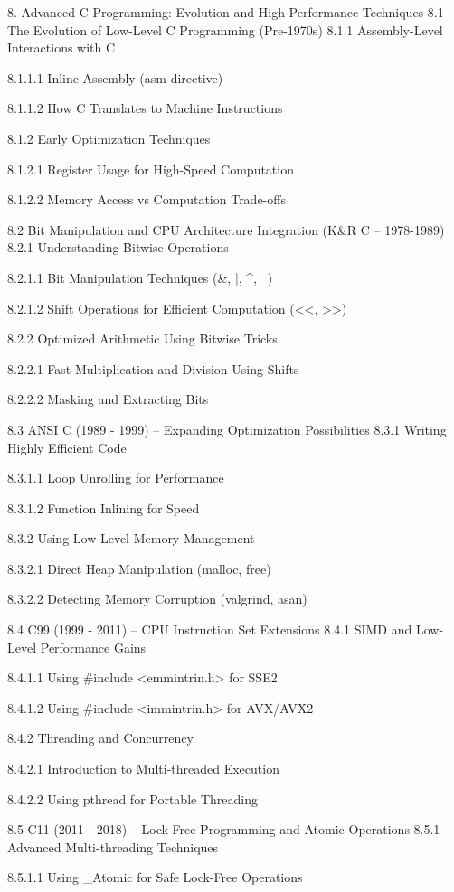 8. Advanced C Programming: Evolution and High-Performance Techniques
8.1 The Evolution of Low-Level C Programming (Pre-1970s)
8.1.1 Assembly-Level Interactions with C

8.1.1.1 Inline Assembly (asm directive)

8.1.1.2 How C Translates to Machine Instructions

8.1.2 Early Optimization Techniques

8.1.2.1 Register Usage for High-Speed Computation

8.1.2.2 Memory Access vs Computation Trade-offs

8.2 Bit Manipulation and CPU Architecture Integration (K&R C – 1978-1989)
8.2.1 Understanding Bitwise Operations

8.2.1.1 Bit Manipulation Techniques (&, |, ^, ~)

8.2.1.2 Shift Operations for Efficient Computation (<<, >>)

8.2.2 Optimized Arithmetic Using Bitwise Tricks

8.2.2.1 Fast Multiplication and Division Using Shifts

8.2.2.2 Masking and Extracting Bits

8.3 ANSI C (1989 - 1999) – Expanding Optimization Possibilities
8.3.1 Writing Highly Efficient Code

8.3.1.1 Loop Unrolling for Performance

8.3.1.2 Function Inlining for Speed

8.3.2 Using Low-Level Memory Management

8.3.2.1 Direct Heap Manipulation (malloc, free)

8.3.2.2 Detecting Memory Corruption (valgrind, asan)

8.4 C99 (1999 - 2011) – CPU Instruction Set Extensions
8.4.1 SIMD and Low-Level Performance Gains

8.4.1.1 Using #include <emmintrin.h> for SSE2

8.4.1.2 Using #include <immintrin.h> for AVX/AVX2

8.4.2 Threading and Concurrency

8.4.2.1 Introduction to Multi-threaded Execution

8.4.2.2 Using pthread for Portable Threading

8.5 C11 (2011 - 2018) – Lock-Free Programming and Atomic Operations
8.5.1 Advanced Multi-threading Techniques

8.5.1.1 Using _Atomic for Safe Lock-Free Operations

